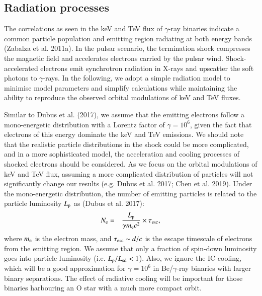 \documentclass{aa}
\begin{document}
\subsection{Radiation processes}
The correlations as seen in the keV and TeV flux of $\gamma$-ray binaries indicate a common particle population and emitting region radiating at both energy bands (Zabalza et al. 2011a). In the pulsar scenario, the termination shock compresses the magnetic field and accelerates electrons carried by the pulsar wind. Shock-accelerated electrons emit synchrotron radiation in X-rays and upscatter the soft photons to $\gamma$-rays.
In the following, we adopt a simple radiation model to minimise model parameters and simplify calculations while maintaining the ability to reproduce the observed orbital modulations of keV and TeV fluxes.

Similar to Dubus et al. (2017), we assume that the emitting electrons follow a mono-energetic distribution with a Lorentz factor of $\gamma=10^6$, given the fact that electrons of this energy dominate the keV and TeV emissions.
We should note that the realistic particle distributions in the shock could be more complicated, and in a more sophisticated model, the acceleration and cooling processes of shocked electrons should be considered. As we focus on the orbital modulations of keV and TeV flux, assuming a more complicated distribution of particles will not significantly change our results (e.g. Dubus et al. 2017; Chen et al. 2019).
Under the mono-energetic distribution, the number of emitting particles is related to the particle luminosity $L_{\rm p}$ as (Dubus et al. 2017):
\begin{eqnarray}\label{Ne}
  N_{\rm e}&=&\frac{L_{\rm p}}{\gamma m_{\rm e}c^2}\times\tau_{\rm esc},
\end{eqnarray}
where $m_{\rm e}$ is the electron mass, and $\tau_{\rm esc}\sim d/c$ is the escape timescale of electrons from the emitting region. We assume that only a fraction of spin-down luminosity goes into particle luminosity (i.e. $L_{\rm p}/L_{\rm sd}<1$). Also, we ignore the IC cooling, which will be a good approximation for $\gamma=10^6$ in Be/$\gamma$-ray binaries with larger binary separations. The
effect of radiative cooling will be important for those binaries harbouring an O star with a much more compact orbit.
\end{document}

